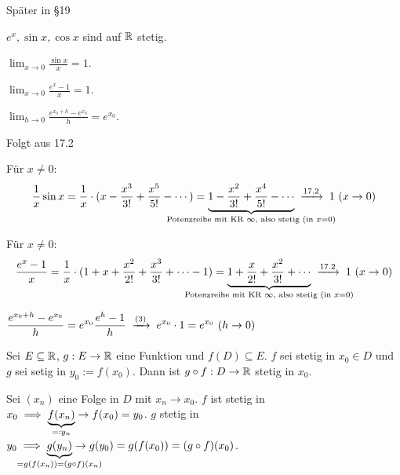 \documentclass[a4paper,oneside,DIV15,BCOR12mm]{scrbook}
\begin{document}
\begin{beweis}
Später in §19
\end{beweis}

\begin{wichtigesbeispiel}
\begin{liste}
\item $e^x, \sin x, \cos x$ sind auf $\mathbb{R}$ stetig.
\item $\displaystyle\lim_{x\to0} \frac{\sin x}{x} = 1$.
\item $\displaystyle\lim_{x\to0} \frac{e^{x}-1}{x} = 1$.
\item $\displaystyle\lim_{h\to0} \frac{e^{x_0+h} - e^{x_0}}{h} = e^{x_0}$.
\end{liste}
\end{wichtigesbeispiel}

\begin{beweise}
\item Folgt aus 17.2
\item Für $x\ne0$:
$$\frac{1}{x}\sin x = \frac{1}{x}\cdot(x - \frac{x^3}{3!} + \frac{x^5}{5!} - \cdots ) = \underbrace{1-\frac{x^2}{3!} + \frac{x^4}{5!} - \cdots}_{\mathclap{\text{Potenzreihe mit KR }\infty\text{, also stetig (in }x=0\text{)}}} \tonach{17.2} 1 \ (x\to 0)$$
\item Für $x\ne0$:
$$\frac{e^{x} -1}{x} = \frac{1}{x}\cdot(1 + x + \frac{x^2}{2!} + \frac{x^3}{3!} + \cdots - 1 ) = \underbrace{1+\frac{x}{2!} + \frac{x^2}{3!} + \cdots}_{\mathclap{\text{Potenzreihe mit KR }\infty\text{, also stetig (in }x=0\text{)}}} \tonach{17.2} 1 \ (x\to 0)$$
\item $\displaystyle\frac{e^{x_0 + h} - e^{x_0}}h = e^{x_0} \frac{e^h-1}h \tonach{(3)} e^{x_0} \cdot 1 = e^{x_0} \ (h\to0)$
\end{beweise}

\begin{satz}
Sei $E \subseteq \mathbb{R}$, $g: E\to\mathbb{R}$ eine Funktion und $f(D) \subseteq E$. $f$ sei stetig in $x_0\in D$ und $g$ sei setig in $y_0 := f(x_0)$. Dann ist $g\circ f: D\to \mathbb{R}$ stetig in $x_0$.
\end{satz}

\begin{beweis}
Sei $(x_n)$ eine Folge in $D$ mit $x_n \to x_0$. $f$ ist stetig in $x_0 \implies \underbrace{f(x_n)}_{=:y_n} \to f(x_0) = y_0$. $g$ stetig in $y_0 \folgt \underbrace{g(y_n)}_{\mathclap{= g(f(x_n)) = (g\circ f)(x_n)}} \to g(y_0) = g(f(x_0)) = (g\circ f)(x_0)$.
\end{beweis}
\end{document}
